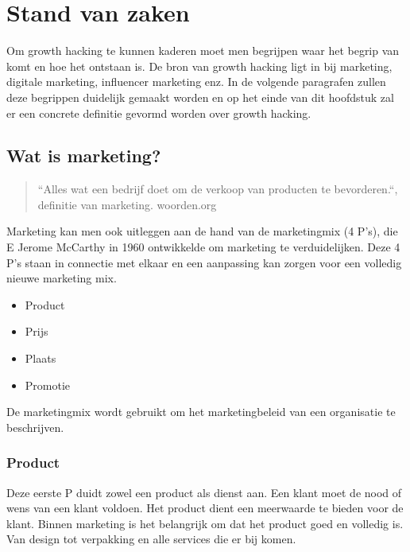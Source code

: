 \chapter{Stand van zaken}
\label{ch:stand-van-zaken}


Om growth hacking te kunnen kaderen moet men begrijpen waar het begrip van komt en hoe het ontstaan is. De bron van growth hacking ligt in bij marketing, digitale marketing, influencer marketing enz. In de volgende paragrafen zullen deze begrippen duidelijk gemaakt worden en op het einde van dit hoofdstuk zal er een concrete definitie gevormd worden over growth hacking.

\section{Wat is marketing?}
\label{sec:marketing}
\begin{quote}
	``Alles wat een bedrijf doet om de verkoop van producten te bevorderen.``, definitie van marketing. \textcopyright  woorden.org
\end{quote}
Marketing kan men ook uitleggen aan de hand van de marketingmix (4 P's), die E Jerome McCarthy in 1960 ontwikkelde om marketing te verduidelijken. Deze 4 P's staan in connectie met elkaar en een aanpassing kan zorgen voor een volledig nieuwe marketing mix.~\autocite{Forsey2019}

\begin{itemize}
	\item Product
	\item Prijs
	\item Plaats
	\item Promotie
\end{itemize}

De marketingmix wordt gebruikt om het marketingbeleid van een organisatie te beschrijven. 

\subsection{Product}
\label{sec:marketing-product}
Deze eerste P duidt zowel een product als dienst aan. Een klant moet de nood of wens van een klant voldoen. Het product dient een meerwaarde te bieden voor de klant. Binnen marketing is het belangrijk om dat het product goed en volledig is. Van design tot verpakking en alle services die er bij komen.
 
